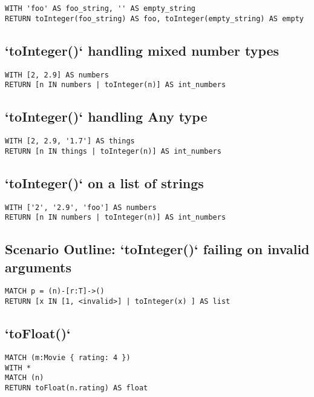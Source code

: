 \begin{lstlisting}
WITH 'foo' AS foo_string, '' AS empty_string
RETURN toInteger(foo_string) AS foo, toInteger(empty_string) AS empty
\end{lstlisting}

\subsection{`toInteger()` handling mixed number types}

\begin{lstlisting}
WITH [2, 2.9] AS numbers
RETURN [n IN numbers | toInteger(n)] AS int_numbers
\end{lstlisting}

\subsection{`toInteger()` handling Any type}

\begin{lstlisting}
WITH [2, 2.9, '1.7'] AS things
RETURN [n IN things | toInteger(n)] AS int_numbers
\end{lstlisting}

\subsection{`toInteger()` on a list of strings}

\begin{lstlisting}
WITH ['2', '2.9', 'foo'] AS numbers
RETURN [n IN numbers | toInteger(n)] AS int_numbers
\end{lstlisting}

\subsection{Scenario Outline: `toInteger()` failing on invalid arguments}

\begin{lstlisting}
MATCH p = (n)-[r:T]->()
RETURN [x IN [1, <invalid>] | toInteger(x) ] AS list
\end{lstlisting}

\subsection{`toFloat()`}

\begin{lstlisting}
MATCH (m:Movie { rating: 4 })
WITH *
MATCH (n)
RETURN toFloat(n.rating) AS float
\end{lstlisting}

